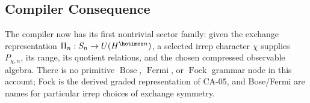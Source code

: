 \subsection{Compiler Consequence}

The compiler now has its first nontrivial sector family: given the exchange
representation \(\Pi_n:S_n\to U(H^{\hotimes n})\), a selected irrep character
\(\chi\) supplies \(P_{\chi,n}\), its range, its quotient relations, and the
chosen compressed observable algebra.  There is no primitive
\(\operatorname{Bose}\), \(\operatorname{Fermi}\), or \(\operatorname{Fock}\)
grammar node in this account; Fock is the derived graded representation of CA-05,
and Bose/Fermi are names for particular irrep choices of exchange symmetry.
